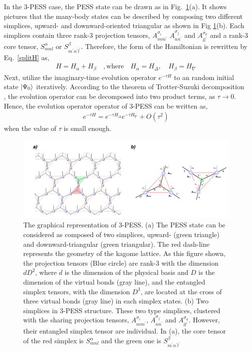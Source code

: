 In the 3-PESS case, the PESS state can be drawn as in Fig.~\ref{fig4321}(a). It shows pictures that the many-body states can be described by composing two different simplices, upward- and downward-oriented triangular as shown in Fig \ref{fig4321}(b). Each simplices contain three rank-3 projection tensors, $A^{\sigma_i}_{mm^{\prime}}$ $A^{\sigma_j}_{nn^{\prime}}$ and $A^{\sigma_k}_{ll^{\prime}}$ and a rank-3 core tensor, $S_{mnl}^{\alpha}$ or $S_{m^{\prime}n^{\prime}l^{\prime}}^{\beta}$. Therefore, the form of the Hamiltonian is rewritten by Eq.~\ref{splitH} as,
\begin{align}
	H = H_{\alpha} + H_{\beta} \quad,\text{where} \quad H_{\alpha} = H_{\Delta},\quad H_{\beta} = H_{\nabla}
\end{align}
Next, utilize the imaginary-time evolution operator $e^{-\tau H}$ to an random initial state $\Ket{\Psi_{0}}$ iteratively. According to the theorem of Trotter-Suzuki decomposition \cite{Suzuki01111976}, the evolution operator can be decomposed into two product terms, as $\tau \rightarrow 0$. Hence, the evolution operator operator of 3-PESS can be written as, 
\begin{align}
	\label{eq415}
	e^{-\tau H} = e^{-\tau H_{\Delta}} e^{-\tau H_{\nabla}} + O(\tau^2)
\end{align}
when the value of $\tau$ is small enough. 
\label{3pess}
\begin{figure}[ht]
	\centering
	\includegraphics[width=1.00\textwidth]{figures/fig4321.png}
	\caption[The graphical representation of 3-PESS]{The graphical representation of 3-PESS. (a) The PESS state can be considered as composed of two simplices, upward- (green triangle) and downward-triangular (green triangular). The red dash-line represents the geometry of the kagome lattice. As this figure shown, the projection tensors (Blue circle) are rank-3 with the dimension $dD^2$, where $d$ is the dimension of the physical basis and $D$ is the dimension of the virtual bonds (gray line), and the entangled simplex tensors, with the dimension $D^3$, are located at the cross of three virtual bonds (gray line) in each simplex states. (b) Two simplices in 3-PESS structure. These two type simplices, clustered with the sharing projection tensors, $A^{\sigma_i}_{mm^{\prime}}$, $A^{\sigma_j}_{nn^{\prime}}$ and $A^{\sigma_k}_{ll^{\prime}}$. However, their entangled simplex tensor are individual. In (a), the core tensor of the red simplex is $S^{\alpha}_{mnl}$ and the green one is $S^{\beta}_{m^{\prime}n^{\prime}l^{\prime}}$}
	\label{fig4321}
\end{figure}

